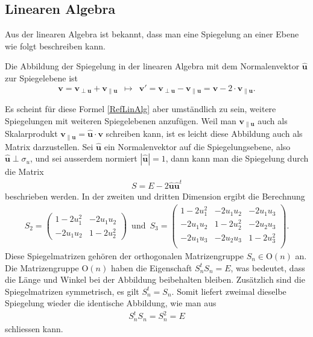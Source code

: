 \subsection{Linearen Algebra}
Aus der linearen Algebra ist bekannt, dass man eine Spiegelung an einer Ebene wie folgt beschreiben kann.
\begin{definition}
	Die Abbildung der Spiegelung in der linearen Algebra mit dem Normalenvektor $\mathbf{\hat{u}}$ zur Spiegelebene ist
	\begin{equation} \label{RefLinAlg}
		\mathbf{v} = \mathbf{v_{\perp u}} + \mathbf{v_{\parallel u}} \enspace\mapsto\enspace \mathbf{v'} =  \mathbf{v_{\perp u}} - \mathbf{v_{\parallel u}} = \mathbf{v} - 2 \cdot \mathbf{v_{\parallel u}}.
	\end{equation}
\end{definition}
Es scheint für diese Formel \eqref{RefLinAlg} aber umständlich zu sein, weitere Spiegelungen mit weiteren Spiegelebenen anzufügen. Weil man $\mathbf{v_{\parallel u}}$ auch als Skalarprodukt $\mathbf{v_{\parallel u}} = \mathbf{\hat{u}} \cdot \mathbf{v}$ schreiben kann, ist es leicht diese Abbildung auch als Matrix darzustellen. Sei $\mathbf{\hat{u}}$ ein Normalenvektor auf die Spiegelungsebene, also $\mathbf{\hat{u}}\perp \sigma_u$, und sei ausserdem normiert $|\mathbf{\hat{u}}| = 1$, dann kann man die Spiegelung durch die Matrix
\begin{align}
	S = E - 2\mathbf{\hat{u}\hat{u}}^t
\end{align}
beschrieben werden. In der zweiten und dritten Dimension ergibt die Berechnung
\begin{align} \label{Spiegelmatrizen}
	S_2 = \begin{pmatrix}
		1-2u_1^2 & -2u_1u_2 \\
		-2u_1u_2 & 1-2u_2^2
	\end{pmatrix}\enspace\text{und}\enspace
	S_3 = \begin{pmatrix}
		1-2u_1^2 & -2u_1u_2 & -2u_1u_3\\
		-2u_1u_2 & 1-2u_2^2 & -2u_2u_3\\
		-2u_1u_3 & -2u_2u_3 & 1-2u_3^2\\
	\end{pmatrix}.
\end{align}
Diese Spiegelmatrizen gehören der orthogonalen Matrizengruppe $S_n\in \text{O}(n)$ an. Die Matrizengruppe $\text{O}(n)$ haben die Eigenschaft $S_n^t S_n = E$, was bedeutet, dass die Länge und Winkel bei der Abbildung beibehalten bleiben. Zusätzlich sind die Spiegelmatrizen symmetrisch, es gilt $S_n^t = S_n$. Somit liefert zweimal dieselbe Spiegelung wieder die identische Abbildung, wie man aus
\begin{align}
	S_n^t S_n = S_n^2 = E
\end{align}
schliessen kann.

